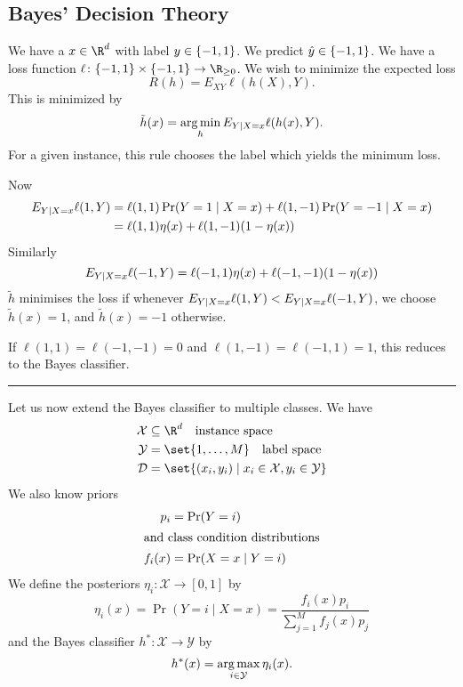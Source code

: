 
\subsection{Bayes' Decision Theory} \label{sec:bayes_decision}
We have a $x \in \R^d$ with label $y \in \{-1, 1\}$.
We predict $\hat{y} \in \{-1, 1\}$.
We have a loss function $\ell\colon \pms \times \pms \to \R_{\ge 0}$.
We wish to minimize the expected loss \[
    R(h) = E_{XY} \ell(h(X), Y).
\] This is minimized by \[
    \tilde{h}(x) = \operatorname*{arg\,min}_h E_{Y \mid X = x} \ell(h(x), Y).
\] For a given instance, this rule chooses the label which yields the
minimum loss.

Now \begin{align*}
    E_{Y \mid X = x} \ell(1, Y)
        &= \ell(1, 1) \Pr(Y = 1 \mid X = x)
            + \ell(1, -1) \Pr(Y = -1 \mid X = x) \\
        &= \ell(1, 1) \eta(x) + \ell(1, -1) (1 - \eta(x))
\end{align*}
Similarly \[
    E_{Y \mid X = x} \ell(-1, Y)
        = \ell(-1, 1) \eta(x) + \ell(-1, -1) (1 - \eta(x))
\] $\tilde h$ minimises the loss if whenever
$E_{Y \mid X = x} \ell(1, Y) < E_{Y \mid X = x} \ell(-1, Y)$,
we choose $\tilde{h}(x) = 1$, and $\tilde{h}(x) = -1$ otherwise.

If $\ell(1, 1) = \ell(-1, -1) = 0$ and $\ell(1, -1) = \ell(-1, 1) = 1$, this
reduces to the Bayes classifier.
\vspace{0.5em}\hrule
Let us now extend the Bayes classifier to multiple classes.
We have \begin{align*}
    \mathcal{X} &\subseteq \R^d \quad \text{instance space} \\
    \mathcal{Y} &= \set{1, \ldots, M} \quad \text{label space} \\
    \mathcal{D} &= \set{(x_i, y_i) \mid x_i \in \mathcal{X},
        y_i \in \mathcal{Y}}
\end{align*}
We also know priors \begin{align*}
    p_i &= \Pr(Y = i) \\
    \intertext{and class condition distributions}
    f_i(x) &= \Pr(X = x \mid Y = i)
\end{align*}
We define the posteriors $\eta_i\colon \mathcal{X} \to [0, 1]$ by \[
    \eta_i(x) = \Pr(Y = i \mid X = x)
        = \frac{f_i(x) p_i}{\sum_{j = 1}^M f_j(x) p_j}
\] and the Bayes classifier $h^*\colon \mathcal{X} \to \mathcal{Y}$ by \[
    h^*(x) = \operatorname*{arg\,max}_{i \in \mathcal{Y}} \eta_i(x).
\]
